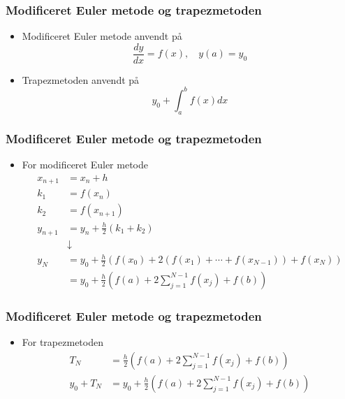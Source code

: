 \begin{frame}
\frametitle{Modificeret Euler metode og \phantom{HHHHHHH} trapezmetoden}
\begin{itemize}
\item Modificeret Euler metode anvendt på $$\frac{dy}{dx}=f(x),\phantom{hi}y(a)=y_0$$
\item Trapezmetoden anvendt på $$y_0 + \int_a^b f(x) dx$$
\end{itemize}
\end{frame}
%
\begin{frame}
\frametitle{Modificeret Euler metode og \phantom{HHHHHHH} trapezmetoden}
\begin{itemize}
\item For modificeret Euler metode
\begin{align*}
x_{n+1} &= x_n + h\\
k_1 &= f(x_n)\\
k_2 &= f(x_{n+1} )\\
y_{n+1} &= y_n + \frac{h}{2}(k_1 + k_2)\\
&\downarrow\\
y_N &= y_0 + \frac{h}{2}\left( f(x_0) + 2(f(x_1) + \cdots + f(x_{N-1})) + f(x_N) \right)\\
 &= y_0 + \frac{h}{2}\left(f(a) + 2\sum_{j=1}^{N-1}f(x_j) + f(b)\right)
\end{align*}
\end{itemize}
\end{frame}
%
\begin{frame}
\frametitle{Modificeret Euler metode og \phantom{HHHHHHH} trapezmetoden}
\begin{itemize}
\item For trapezmetoden
\begin{align*}
T_N &= \frac{h}{2} \left(f(a) + 2\sum_{j=1}^{N-1} f(x_j) + f(b) \right)\\
y_0 + T_N  &= y_0 + \frac{h}{2} \left(f(a) + 2\sum_{j=1}^{N-1} f(x_j) + f(b) \right)
\end{align*}
\end{itemize}
\end{frame}